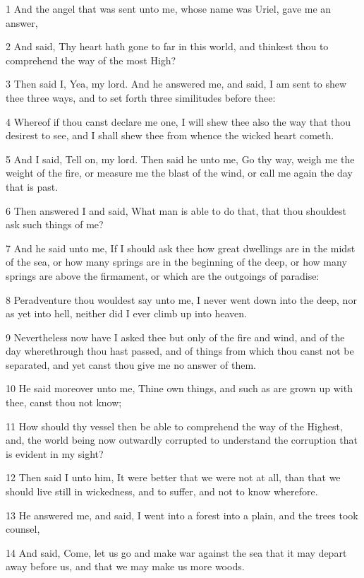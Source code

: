 \par 1 And the angel that was sent unto me, whose name was Uriel, gave me an answer,
\par 2 And said, Thy heart hath gone to far in this world, and thinkest thou to comprehend the way of the most High?
\par 3 Then said I, Yea, my lord. And he answered me, and said, I am sent to shew thee three ways, and to set forth three similitudes before thee:
\par 4 Whereof if thou canst declare me one, I will shew thee also the way that thou desirest to see, and I shall shew thee from whence the wicked heart cometh.
\par 5 And I said, Tell on, my lord. Then said he unto me, Go thy way, weigh me the weight of the fire, or measure me the blast of the wind, or call me again the day that is past.
\par 6 Then answered I and said, What man is able to do that, that thou shouldest ask such things of me?
\par 7 And he said unto me, If I should ask thee how great dwellings are in the midst of the sea, or how many springs are in the beginning of the deep, or how many springs are above the firmament, or which are the outgoings of paradise:
\par 8 Peradventure thou wouldest say unto me, I never went down into the deep, nor as yet into hell, neither did I ever climb up into heaven.
\par 9 Nevertheless now have I asked thee but only of the fire and wind, and of the day wherethrough thou hast passed, and of things from which thou canst not be separated, and yet canst thou give me no answer of them.
\par 10 He said moreover unto me, Thine own things, and such as are grown up with thee, canst thou not know;
\par 11 How should thy vessel then be able to comprehend the way of the Highest, and, the world being now outwardly corrupted to understand the corruption that is evident in my sight?
\par 12 Then said I unto him, It were better that we were not at all, than that we should live still in wickedness, and to suffer, and not to know wherefore.
\par 13 He answered me, and said, I went into a forest into a plain, and the trees took counsel,
\par 14 And said, Come, let us go and make war against the sea that it may depart away before us, and that we may make us more woods.
